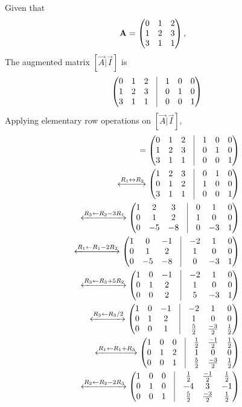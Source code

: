 
    Given that
    \begin{align}
    \mathbf{A}& =\begin{pmatrix} 0 & 1 & 2\\1 & 2 & 3\\3 & 1 & 1\end{pmatrix},
    \end{align}
     The augmented matrix $[\vec{A} | \vec{I}]$ is 
    \begin{align}
    \myvec{0 & 1 & 2 & \vrule & 1 & 0 & 0\\1 & 2 & 3 & \vrule & 0 & 1 & 0\\3 & 1 & 1 & \vrule & 0 & 0 & 1}
    \end{align}
    Applying elementary row operations on $[\vec{A} | \vec{I}]$, 
    \begin{align}
    [\vec{A} | \vec{I}] = \myvec{0 & 1 & 2 & \vrule & 1 & 0 & 0\\1 & 2 & 3 & \vrule & 0 & 1 & 0\\3 & 1 & 1 & \vrule & 0 & 0 & 1}
    \\
    \xleftrightarrow{R_1\leftrightarrow R_2}   
    \myvec{1 & 2 & 3 & \vrule & 0 & 1 & 0\\0 & 1 & 2 & \vrule & 1 & 0 & 0\\3 & 1 & 1 & \vrule & 0 & 0 & 1}
    \\
    \xleftrightarrow{R_3\leftarrow R_3-3R_1}   
    \myvec{1 & 2 & 3 & \vrule & 0 & 1 & 0\\0 & 1 & 2 & \vrule & 1 & 0 & 0\\0 & -5 & -8 & \vrule & 0 & -3 & 1}
    \\
    \xleftrightarrow{R_1\leftarrow R_1-2R_2}  
    \myvec{1 & 0 & -1 & \vrule & -2 & 1 & 0\\0 & 1 & 2 & \vrule & 1 & 0 & 0\\0 & -5 & -8 & \vrule & 0 & -3 & 1}
    \\
    \xleftrightarrow{R_3\leftarrow R_3+5R_2}  
    \myvec{1 & 0 & -1 & \vrule & -2 & 1 & 0\\0 & 1 & 2 & \vrule & 1 & 0 & 0\\0 & 0 & 2 & \vrule & 5 & -3 & 1}
    \\
    \xleftrightarrow{R_3\leftarrow R_3/2}
    \myvec{1 & 0 & -1 & \vrule & -2 & 1 & 0\\ 0 & 1 & 2 & \vrule & 1 & 0 & 0\\0 & 0 & 1 &\vrule &\frac{5}{2} &\frac{-3}{2} &\frac{1}{2}}
    \\
    \xleftrightarrow{R_1\leftarrow R_1+R_3}
    \myvec{1 & 0 & 0 & \vrule & \frac{1}{2} & \frac{-1}{2} & \frac{1}{2}\\ 0 & 1 & 2 & \vrule & 1 & 0 & 0\\0 & 0 & 1 &\vrule &\frac{5}{2} &\frac{-3}{2} &\frac{1}{2}}
    \\
    \xleftrightarrow{R_2\leftarrow R_2-2R_3}
    \myvec{1 & 0 & 0 & \vrule & \frac{1}{2} & \frac{-1}{2} & \frac{1}{2}\\ 0 & 1 & 0 & \vrule & -4 & 3 & -1\\0 & 0 & 1 &\vrule &\frac{5}{2} &\frac{-3}{2} &\frac{1}{2}}
    \end{align}
